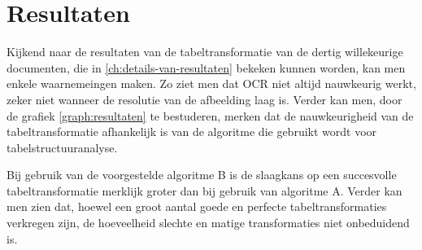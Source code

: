 
\chapter{Resultaten}
\label{ch:resultaten}

Kijkend naar de resultaten van de tabeltransformatie van de dertig willekeurige documenten, die in \ref{ch:details-van-resultaten} bekeken kunnen worden, kan men enkele waarnemeingen maken. Zo ziet men dat \Gls{OCR} niet altijd nauwkeurig werkt, zeker niet wanneer de resolutie van de afbeelding laag is. Verder kan men, door de grafiek \ref{graph:resultaten} te bestuderen, merken dat de nauwkeurigheid van de tabeltransformatie afhankelijk is van de algoritme die gebruikt wordt voor tabelstructuuranalyse. 


Bij gebruik van de voorgestelde algoritme B is de slaagkans op een succesvolle tabeltransformatie merklijk groter dan bij gebruik van algoritme A. Verder kan men zien dat, hoewel een groot aantal goede en perfecte tabeltransformaties verkregen zijn, de hoeveelheid slechte en matige transformaties niet onbeduidend is.
